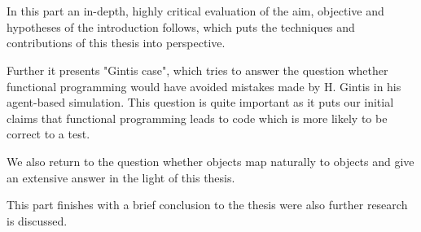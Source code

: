 \chapter*{}
\label{ch:discussion}

In this part an in-depth, highly critical evaluation of the aim, objective and hypotheses of the introduction follows, which puts the techniques and contributions of this thesis into perspective.

Further it presents "Gintis case", which tries to answer the question whether functional programming would have avoided mistakes made by H. Gintis in his agent-based simulation. This question is quite important as it puts our initial claims that functional programming leads to code which is more likely to be correct to a test. 

We also return to the question whether objects map naturally to objects and give an extensive answer in the light of this thesis.

This part finishes with a brief conclusion to the thesis were also further research is discussed.






